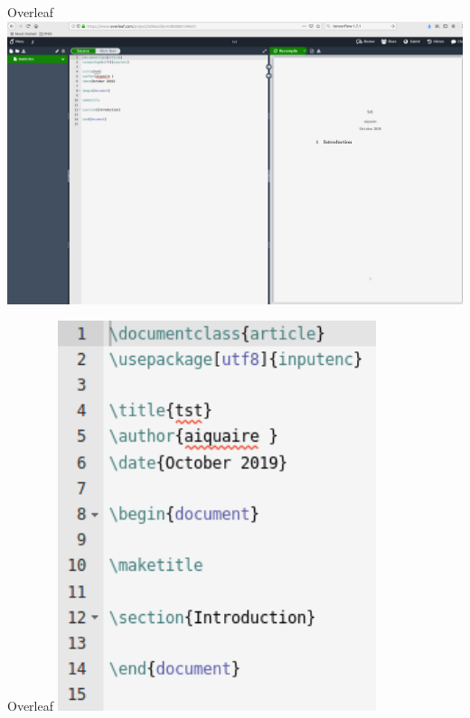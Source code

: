 \documentclass{beamer}
\begin{document}
\begin{frame}{Overleaf}
\includegraphics[width=\textwidth]{pic/over4.png}
\end{frame}
\begin{frame}{Overleaf}
\includegraphics[width=0.7\textwidth]{pic/over5.png}
\end{frame}
\end{document}
